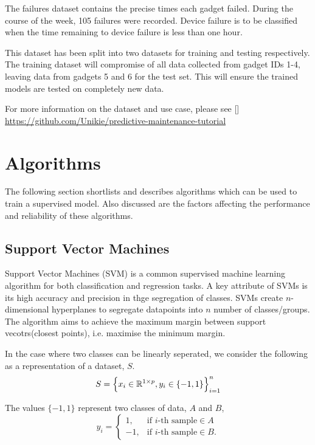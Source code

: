 The failures dataset contains the precise times each gadget failed. 
During the course of the week, 105 failures were recorded.
Device failure is to be classified when the time remaining to device failure is less than one hour.

This dataset has been split into two datasets for training and testing respectively.
The training dataset will compromise of all data collected from gadget IDs 1-4, leaving data from gadgets 5 and 6 for the test set.
This will ensure the trained models are tested on completely new data. 

For more information on the dataset and use case, please see []
\hyperlink{gitub repo}{https://github.com/Unikie/predictive-maintenance-tutorial}

\section{Algorithms}
The following section shortlists and describes algorithms which can be used to train a supervised model. 
Also discussed are the factors affecting the performance and reliability of these algorithms.

\subsection{Support Vector Machines}
Support Vector Machines (SVM) is a common supervised machine learning algorithm for both classification and regression tasks.
A key attribute of SVMs is its high accuracy and precision in thge segregation of classes.
SVMs create $n$-dimensional hyperplanes to segregate datapoints into $n$ number of classes/groups. 
The algorithm aims to achieve the maximum margin between support vecotrs(closest points), i.e. maximise the minimum margin.

In the case where two classes can be linearly seperated, we consider the following as a representation of a dataset, $S$.
\begin{equation}
    S = \Big\{x_i \in \mathbb{R}^{1 \times p}, y_i \in \{-1, 1\}\Big\}^n_{i=1}
\end{equation}

The values $\{-1, 1\}$ represent two classes of data, $A$ and $B$,
\begin{equation}
    y_i = \begin{cases}
        1, & \text{if $i$} \text{-th sample} \in  A\\
        -1, & \text{if $i$} \text{-th sample} \in  B.
    \end{cases}
\end{equation}

